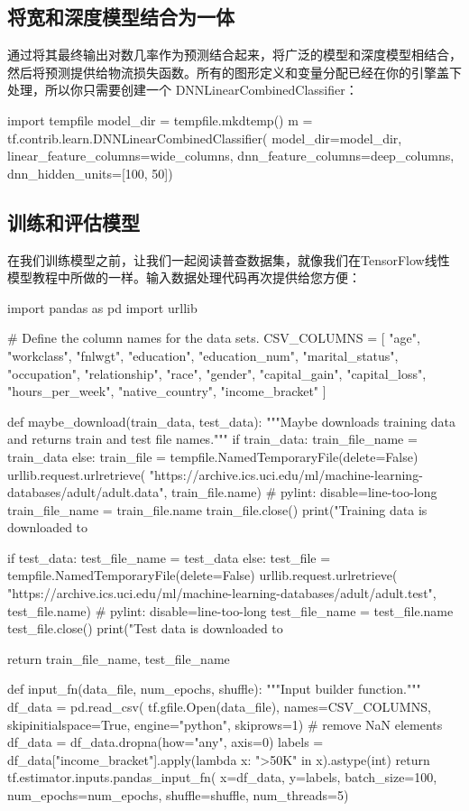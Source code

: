 \subsection{将宽和深度模型结合为一体}
通过将其最终输出对数几率作为预测结合起来，将广泛的模型和深度模型相结合，然后将预测提供给物流损失函数。所有的图形定义和变量分配已经在你的引擎盖下处理，所以你只需要创建一个 DNNLinearCombinedClassifier：
\begin{python}
import tempfile
model_dir = tempfile.mkdtemp()
m = tf.contrib.learn.DNNLinearCombinedClassifier(
    model_dir=model_dir,
    linear_feature_columns=wide_columns,
    dnn_feature_columns=deep_columns,
    dnn_hidden_units=[100, 50]) 
\end{python}
\subsection{训练和评估模型}
在我们训练模型之前，让我们一起阅读普查数据集，就像我们在TensorFlow线性模型教程中所做的一样。输入数据处理代码再次提供给您方便：
\begin{python}
import pandas as pd
import urllib

# Define the column names for the data sets.
CSV_COLUMNS = [
    "age", "workclass", "fnlwgt", "education", "education_num",
    "marital_status", "occupation", "relationship", "race", "gender",
    "capital_gain", "capital_loss", "hours_per_week", "native_country",
    "income_bracket"
]

def maybe_download(train_data, test_data):
  """Maybe downloads training data and returns train and test file names."""
  if train_data:
    train_file_name = train_data
  else:
    train_file = tempfile.NamedTemporaryFile(delete=False)
    urllib.request.urlretrieve(
        "https://archive.ics.uci.edu/ml/machine-learning-databases/adult/adult.data",
        train_file.name)  # pylint: disable=line-too-long
    train_file_name = train_file.name
    train_file.close()
    print("Training data is downloaded to %

  if test_data:
    test_file_name = test_data
  else:
    test_file = tempfile.NamedTemporaryFile(delete=False)
    urllib.request.urlretrieve(
        "https://archive.ics.uci.edu/ml/machine-learning-databases/adult/adult.test",
        test_file.name)  # pylint: disable=line-too-long
    test_file_name = test_file.name
    test_file.close()
    print("Test data is downloaded to %

  return train_file_name, test_file_name

def input_fn(data_file, num_epochs, shuffle):
  """Input builder function."""
  df_data = pd.read_csv(
      tf.gfile.Open(data_file),
      names=CSV_COLUMNS,
      skipinitialspace=True,
      engine="python",
      skiprows=1)
  # remove NaN elements
  df_data = df_data.dropna(how="any", axis=0)
  labels = df_data["income_bracket"].apply(lambda x: ">50K" in x).astype(int)
  return tf.estimator.inputs.pandas_input_fn(
      x=df_data,
      y=labels,
      batch_size=100,
      num_epochs=num_epochs,
      shuffle=shuffle,
      num_threads=5)
\end{python}
